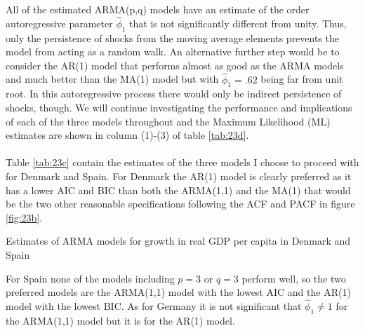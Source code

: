 All of the estimated ARMA(p,q) models have an estimate of the  order autoregressive parameter $\hat{\phi}_1$ that is not significantly different from unity. Thus, only the persistence of shocks from the moving average elements prevents the model from acting as a random walk. An alternative further step would be to consider the AR(1) model that performs almost as good as the ARMA models and much better than the MA(1) model but with $\hat{\phi}_1=.62$ being far from unit root. In this autoregressive process there would only be indirect persistence of shocks, though. We will continue investigating the performance and implications of each of the three models throughout and the Maximum Likelihood (ML) estimates are shown in column (1)-(3) of table \ref{tab:23d}.
\\
\\
Table \ref{tab:23c} contain the estimates of the three models I choose to proceed with for Denmark and Spain. For Denmark the AR(1) model is clearly preferred as it has a lower AIC and BIC than both the ARMA(1,1) and the MA(1) that would be the two other reasonable specifications following the ACF and PACF in figure \ref{fig:23b}.
\begin{table}[H]
  \centering
  \caption{Estimates of ARMA models for growth in real GDP per capita in Denmark and Spain}
  \footnotesize
    
  \label{tab:23c}
\end{table}\noindent
For Spain none of the models including $p=3$ or $q=3$ perform well, so the two preferred models are the ARMA(1,1) model with the lowest AIC and the AR(1) model with the lowest BIC. As for Germany it is not significant that $\hat{\phi}_1\neq1$ for the ARMA(1,1) model but it is for the AR(1) model.

